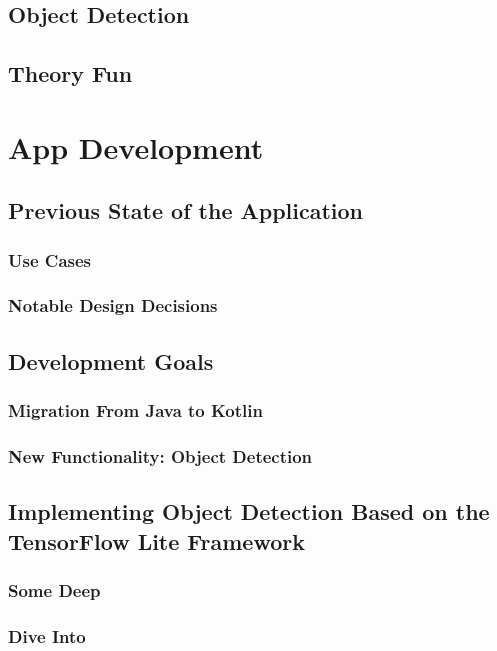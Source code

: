 \documentclass[11pt,
               a4paper,
               bibtotoc,
               idxtotoc,
               headsepline,
               footsepline,
               footexclude,
               BCOR12mm,
               DIV13,
               openany,   %
               ]
               {scrbook}
\begin{document}
\section{Object Detection}
\section{Theory Fun}

\chapter{App Development}

\section{Previous State of the Application}

\subsection{Use Cases}

\subsection{Notable Design Decisions}

\section{Development Goals}

\subsection{Migration From Java to Kotlin}

\subsection{New Functionality: Object Detection}

\section{Implementing Object Detection Based on the TensorFlow Lite Framework}

\subsection{Some Deep}
\subsection{Dive Into}
\end{document}
